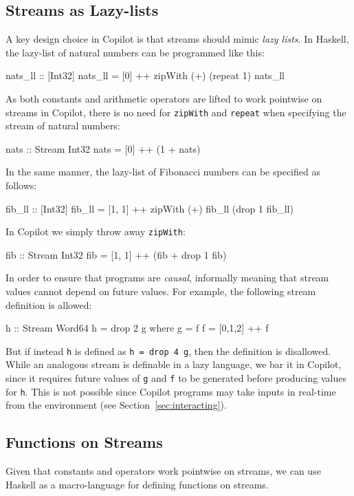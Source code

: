 \documentclass[]{article}
\theoremstyle{example}
\begin{document}
\subsection{Streams as Lazy-lists}

A key design choice in Copilot is that streams should mimic \emph{lazy lists}.
In Haskell, the lazy-list of natural numbers can be programmed like this:
%
\begin{code}
nats_ll :: [Int32]
nats_ll = [0] ++ zipWith (+) (repeat 1) nats_ll
\end{code}
%
As both constants and arithmetic operators are lifted to work pointwise on
streams in Copilot, there is no need for {\tt zipWith} and {\tt repeat} when
specifying the stream of natural numbers:
%
\begin{code}
nats :: Stream Int32
nats = [0] ++ (1 + nats)
\end{code}
%
In the same manner, the lazy-list of Fibonacci numbers can be specified as follows:
%
\begin{code}
fib_ll :: [Int32]
fib_ll = [1, 1] ++ zipWith (+) fib_ll (drop 1 fib_ll)
\end{code}
%
In Copilot we simply throw away {\tt zipWith}:
\begin{code}
fib :: Stream Int32
fib = [1, 1] ++ (fib + drop 1 fib)
\end{code}

In order to ensure that programs are \emph{causal}, informally meaning that
stream values cannot depend on future values.  For example, the following stream
definition is allowed:
%
\begin{code}
h :: Stream Word64
h = drop 2 g
  where g = f
        f = [0,1,2] ++ f
\end{code}
%

But if instead {\tt h} is defined as {\tt h = drop 4 g}, then the definition is
disallowed.  While an analogous stream is definable in a lazy language, we bar
it in Copilot, since it requires future values of {\tt g} and {\tt f} to be
generated before producing values for {\tt h}.  This is not possible since
Copilot programs may take inputs in real-time from the environment (see
Section~\ref{sec:interacting}).

\subsection{Functions on Streams}

Given that constants and operators work pointwise on streams, we can use Haskell
as a macro-language for defining functions on streams.
\end{document}
